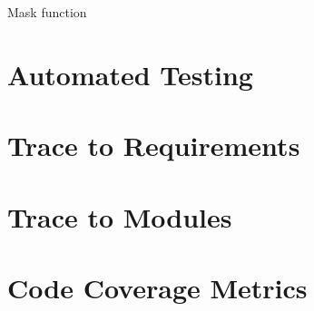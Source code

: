 \documentclass[12pt, titlepage]{article}
\begin{document}
Mask function 

\section{Automated Testing}
		
\section{Trace to Requirements}
		
\section{Trace to Modules}		

\section{Code Coverage Metrics}




\end{document}
